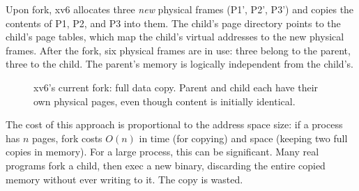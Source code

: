 \documentclass[11pt]{article}
\begin{document}
Upon fork, xv6 allocates three \emph{new} physical frames (P1', P2', P3') and copies the contents of P1, P2, and P3 into them. The child's page directory points to the child's page tables, which map the child's virtual addresses to the new physical frames. After the fork, six physical frames are in use: three belong to the parent, three to the child. The parent's memory is logically independent from the child's.

\begin{figure}[h]
\begin{center}
\end{center}
\caption{xv6's current fork: full data copy. Parent and child each have their own physical pages, even though content is initially identical.}
\end{figure}

The cost of this approach is proportional to the address space size: if a process has $n$ pages, fork costs $O(n)$ in time (for copying) and space (keeping two full copies in memory). For a large process, this can be significant. Many real programs fork a child, then exec a new binary, discarding the entire copied memory without ever writing to it. The copy is wasted.

\end{document}
